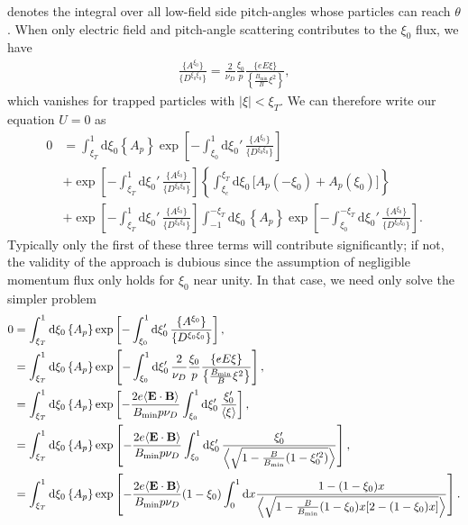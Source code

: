 \documentclass[11pt,a4paper]{article}
\newcommand{\rd}{\ensuremath{\mathrm{d}}}
\newcommand{\sub}[1]{\ensuremath{_{\text{#1}}}}
\renewcommand{\b}[1]{\ensuremath{ {\bf #1 } }}
\begin{document}
denotes the integral over all low-field side pitch-angles whose particles can reach $\theta$. When only electric field and pitch-angle scattering contributes to the $\xi_0$ flux, we have
\begin{align}
\frac{\{A^{\xi_0}\}}{\{D^{\xi_0\xi_0}\}} = \frac{2}{\nu_D} \frac{\xi_0}{p} \frac{\{eE\xi \}}{\left\{\frac{B\sub{min}}{B}\xi^2\right\}},
\end{align}
which vanishes for trapped particles with $|\xi| < \xi_T$. We can therefore write our equation $U=0$ as
\begin{align}
0 &= \int_{\xi_T}^1\rd \xi_0 \left\{  A_p   \right\} \exp \left[-\int_{\xi_0}^1\rd \xi_0' \,\frac{\{A^{\xi_0}\}}{\{D^{\xi_0\xi_0}\}} \right]\nonumber \\
&+  \exp \left[-\int_{\xi_T}^1\rd \xi_0' \,\frac{\{A^{\xi_0}\}}{\{D^{\xi_0\xi_0}\}} \right]\left\{\int_{\xi_c}^{\xi_T}\rd \xi_0 \, \bigl[ A_p(-\xi_0) + A_p(\xi_0) \bigr] \right\}\nonumber \\
& +  \exp \left[-\int_{\xi_T}^1\rd \xi_0' \,\frac{\{A^{\xi_0}\}}{\{D^{\xi_0\xi_0}\}} \right] \int_{-1}^{-\xi_T} \rd \xi_0  \, \left\{ A_p \right\} \exp \left[-\int_{\xi_0}^{-\xi_T}\rd \xi_0' \,\frac{\{A^{\xi_0}\}}{\{D^{\xi_0\xi_0}\}} \right].
\end{align}
Typically only the first of these three terms will contribute significantly; if not, the validity of the approach is dubious since the assumption of negligible momentum flux only holds for $\xi_0$ near unity. In that case, we need only solve the simpler problem
\begin{align}
0 &= \int_{\xi_T}^1\rd \xi_0 \left\{ A_p   \right\} \exp \left[-\int_{\xi_0}^1\rd \xi_0' \,\frac{\{A^{\xi_0}\}}{\{D^{\xi_0\xi_0}\}} \right], \nonumber \\
&=  \int_{\xi_T}^1\rd \xi_0 \left\{ A_p   \right\} \exp \left[-\int_{\xi_0}^1\rd \xi_0' \,\frac{2}{\nu_D} \frac{\xi_0}{p} \frac{\{eE\xi \}}{\left\{\frac{B\sub{min}}{B}\xi^2\right\}} \right], \nonumber \\
&= \int_{\xi_T}^1\rd \xi_0 \left\{ A_p   \right\} \exp \left[-\frac{2e\langle \b{E}\cdot\b{B}\rangle}{B\sub{min} p \nu_D}\int_{\xi_0}^1\rd \xi_0' \,  \frac{\xi_0'}{\left\langle \xi\right\rangle} \right], \nonumber \\
&= \int_{\xi_T}^1\rd \xi_0 \left\{ A_p   \right\} \exp \left[-\frac{2e\langle \b{E}\cdot\b{B}\rangle}{B\sub{min} p \nu_D}\int_{\xi_0}^1\rd \xi_0' \,  \frac{\xi_0'}{\left\langle \sqrt{1-\frac{B}{B\sub{min}}(1-\xi_0'^2)}\right\rangle} \right], \nonumber \\
&= \int_{\xi_T}^1\rd \xi_0 \left\{ A_p   \right\}  \exp \left[-\frac{2e\langle \b{E}\cdot\b{B}\rangle}{B\sub{min} p \nu_D}(1-\xi_0)\int_0^{1} \rd x   \frac{1-(1-\xi_0)x}{\left\langle \sqrt{1-\frac{B}{B\sub{min}} (1-\xi_0)x[2-(1-\xi_0)x]}\right\rangle} \right].
\end{align}
\end{document}
